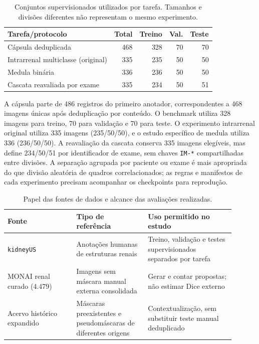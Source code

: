 \documentclass[12pt]{article}
\begin{document}
\begin{table}[!htbp]
\centering
\caption[Conjuntos supervisionados por tarefa e protocolo]{Conjuntos supervisionados utilizados por tarefa. Tamanhos e divisões diferentes não representam o mesmo experimento.}
\label{tab:datasets}
\begin{tabular}{lrrrr}
\toprule
\textbf{Tarefa/protocolo} & \textbf{Total} & \textbf{Treino} & \textbf{Val.} & \textbf{Teste} \\
\midrule
Cápsula deduplicada & 468 & 328 & 70 & 70 \\
Intrarrenal multiclasse (original) & 335 & 235 & 50 & 50 \\
Medula binária & 336 & 236 & 50 & 50 \\
Cascata reavaliada por exame & 335 & 234 & 50 & 51 \\
\bottomrule
\end{tabular}
\end{table}

A cápsula parte de 486 registros do primeiro anotador, correspondentes a 468 imagens únicas após deduplicação por conteúdo. O benchmark utiliza 328 imagens para treino, 70 para validação e 70 para teste. O experimento intrarrenal original utiliza 335 imagens (235/50/50), e o estudo específico de medula utiliza 336 (236/50/50). A reavaliação da cascata conserva 335 imagens elegíveis, mas define 234/50/51 por identificador de exame, sem chaves \texttt{IM-*} compartilhadas entre divisões. A separação agrupada por paciente ou exame é mais apropriada do que divisão aleatória de quadros correlacionados; as regras e manifestos de cada experimento precisam acompanhar os checkpoints para reprodução.

\begin{table}[!htbp]
\centering
\caption[Fontes de dados e alcance das avaliações]{Papel das fontes de dados e alcance das avaliações realizadas.}
\label{tab:fontes_e_evidencias}
\begin{tabular}{p{0.27\linewidth}p{0.29\linewidth}p{0.34\linewidth}}
\toprule
\textbf{Fonte} & \textbf{Tipo de referência} & \textbf{Uso permitido no estudo} \\
\midrule
\texttt{kidneyUS} & Anotações humanas de estruturas renais & Treino, validação e testes supervisionados separados por tarefa \\
MONAI renal curado (4.479) & Imagens sem máscara manual externa consolidada & Gerar e contar propostas; não estimar Dice externo \\
Acervo histórico expandido & Máscaras preexistentes e pseudomáscaras de diferentes origens & Contextualização, sem substituir teste manual deduplicado \\
\bottomrule
\end{tabular}
\end{table}
\end{document}
